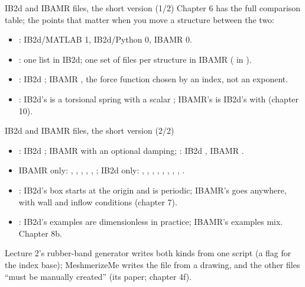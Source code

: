\documentclass[aspectratio=169,11pt]{beamer}
\begin{document}
\begin{frame}{IB2d and IBAMR files, the short version (1/2)}
\label{fr:ibamr}
\small
Chapter 6 has the full comparison table; the points that matter when you move a structure between the two:
\begin{itemize}
  \item {}: IB2d/MATLAB 1, IB2d/Python 0, IBAMR 0.
  \item {}: one list in IB2d; one set of files per structure in IBAMR ( in ).
  \item {}: IB2d ; IBAMR , the force function chosen by an index, not an exponent.
  \item {}: IB2d's  is a torsional spring with a scalar ; IBAMR's  is IB2d's  with  (chapter 10).
\end{itemize}
\end{frame}

\begin{frame}{IB2d and IBAMR files, the short version (2/2)}
\label{fr:ibamr2}
\small
\begin{itemize}
  \item {}: IB2d ; IBAMR  with an optional damping; : IB2d , IBAMR .
  \item IBAMR only: , , , , , ; IB2d only: , , , , , , , , .
  \item {}: IB2d's box starts at the origin and is periodic; IBAMR's goes anywhere, with wall and inflow conditions (chapter 7).
  \item {}: IB2d's examples are dimensionless in practice; IBAMR's examples mix. Chapter 8b.
\end{itemize}
Lecture 2's rubber-band generator writes both kinds from one script (a flag for the index base); MeshmerizeMe writes the  file from a drawing, and the other files ``must be manually created'' (its paper; chapter 4f).
\end{frame}
\end{document}
